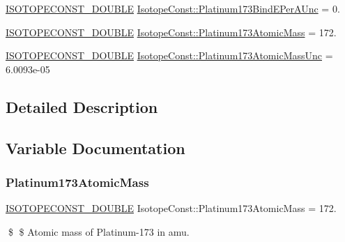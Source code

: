 \begin{DoxyCompactItemize}
\mbox{\hyperlink{group___isotope_const-_macros_ga8f45a7272ce02c0b4c65c44636ed719a}{I\+S\+O\+T\+O\+P\+E\+C\+O\+N\+S\+T\+\_\+\+D\+O\+U\+B\+LE}} \mbox{\hyperlink{group___isotope_const-_platinum-_pt173_gaf91dbdb13db62c4cfc872aa434ca8196}{Isotope\+Const\+::\+Platinum173\+Bind\+E\+Per\+A\+Unc}} = 0.
\item 
\mbox{\hyperlink{group___isotope_const-_macros_ga8f45a7272ce02c0b4c65c44636ed719a}{I\+S\+O\+T\+O\+P\+E\+C\+O\+N\+S\+T\+\_\+\+D\+O\+U\+B\+LE}} \mbox{\hyperlink{group___isotope_const-_platinum-_pt173_ga2e8770a33839f999fc73fbf505eb0710}{Isotope\+Const\+::\+Platinum173\+Atomic\+Mass}} = 172.
\item 
\mbox{\hyperlink{group___isotope_const-_macros_ga8f45a7272ce02c0b4c65c44636ed719a}{I\+S\+O\+T\+O\+P\+E\+C\+O\+N\+S\+T\+\_\+\+D\+O\+U\+B\+LE}} \mbox{\hyperlink{group___isotope_const-_platinum-_pt173_ga20c7a76da548674ab2d9db67c9458997}{Isotope\+Const\+::\+Platinum173\+Atomic\+Mass\+Unc}} = 6.\+0093e-\/05
\end{DoxyCompactItemize}


\subsection{Detailed Description}


\subsection{Variable Documentation}
\mbox{\label{group___isotope_const-_platinum-_pt173_ga2e8770a33839f999fc73fbf505eb0710}} 
\subsubsection{\texorpdfstring{Platinum173\+Atomic\+Mass}{Platinum173AtomicMass}}
{\footnotesize\ttfamily \mbox{\hyperlink{group___isotope_const-_macros_ga8f45a7272ce02c0b4c65c44636ed719a}{I\+S\+O\+T\+O\+P\+E\+C\+O\+N\+S\+T\+\_\+\+D\+O\+U\+B\+LE}} Isotope\+Const\+::\+Platinum173\+Atomic\+Mass = 172.}

\$ \$ Atomic mass of Platinum-\/173 in amu. \mbox{\label{group___isotope_const-_platinum-_pt173_ga20c7a76da548674ab2d9db67c9458997}} 
